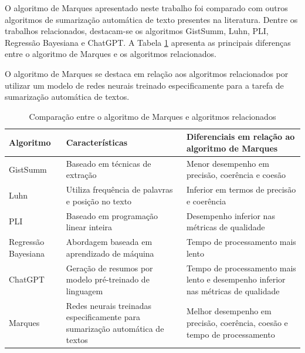 O algoritmo de Marques apresentado neste trabalho foi comparado com outros algoritmos de sumarização automática de texto presentes na literatura. Dentre os trabalhos relacionados, destacam-se os algoritmos GistSumm, Luhn, PLI, Regressão Bayesiana e ChatGPT. A Tabela  \ref{tab:comparacao_marques_trabalhos_relacionados} apresenta as principais diferenças entre o algoritmo de Marques e os algoritmos relacionados.

O algoritmo de Marques se destaca em relação aos algoritmos relacionados por utilizar um modelo de redes neurais treinado especificamente para a tarefa de sumarização automática de textos.

\begin{table}[ht]
\centering
\caption{Comparação entre o algoritmo de Marques e algoritmos relacionados}
\label{tab:comparacao_marques_trabalhos_relacionados}
    \begin{tabular}{|l|p{6cm}|p{6cm}|}
    \hline
        \textbf{Algoritmo} & \textbf{Características} & \textbf{Diferenciais em relação ao algoritmo de Marques} \\ \hline
        GistSumm & Baseado em técnicas de extração & Menor desempenho em precisão, coerência e coesão \\ \hline
        Luhn & Utiliza frequência de palavras e posição no texto & Inferior em termos de precisão e coerência \\ \hline
        PLI & Baseado em programação linear inteira & Desempenho inferior nas métricas de qualidade \\ \hline
        Regressão Bayesiana & Abordagem baseada em aprendizado de máquina & Tempo de processamento mais lento \\ \hline
        ChatGPT & Geração de resumos por modelo pré-treinado de linguagem & Tempo de processamento mais lento e desempenho inferior nas métricas de qualidade \\ \hline
        Marques & Redes neurais treinadas especificamente para sumarização automática de textos & Melhor desempenho em precisão, coerência, coesão e tempo de processamento \\ \hline
    \end{tabular}
\end{table}